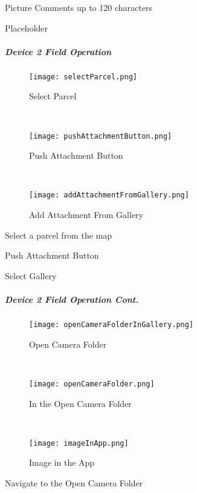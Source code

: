 \noindent Picture Comments up to 120 characters
\vspace{2.5in}

\noindent Placeholder
\clearpage
\subparagraph{Device 2 Field Operation}
\begin{wrapfigure}{r}{0.4\textwidth}
\centering
    \texttt{[image: selectParcel.png]}
\caption {Select Parcel}
\vspace{.1in}

\HRule \\[.4cm] %
\vspace{.1in}

    \texttt{[image: pushAttachmentButton.png]}
\caption{Push Attachment Button}
\vspace{.1in}

\HRule \\[.4cm] %
\vspace{.05in}

    \texttt{[image: addAttachmentFromGallery.png]}
\caption{Add Attachment From Gallery}
\end{wrapfigure}
Select a parcel from the map
\vspace{2in}

\noindent Push Attachment Button
\vspace{2in}

\noindent Select Gallery
\clearpage
\subparagraph*{Device 2 Field Operation Cont.}
\begin{wrapfigure}{r}{0.4\textwidth}
\centering
    \texttt{[image: openCameraFolderInGallery.png]}
\caption {Open Camera Folder}
\vspace{.05in}

\HRule \\[.4cm] %
\vspace{.05in}

    \texttt{[image: openCameraFolder.png]}
\caption{In the Open Camera Folder}
\vspace{.1in}

\HRule \\[.4cm] %
\vspace{.05in}

    \texttt{[image: imageInApp.png]}
\caption{Image in the App}
\end{wrapfigure}
Navigate to the Open Camera Folder
\vspace{2in}

